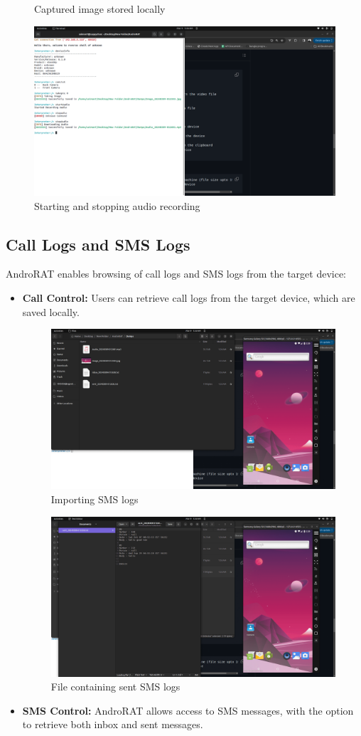 \documentclass[12pt]{article}
\begin{document}
\begin{itemize}
\begin{figure}[h!]
      \caption{Captured image stored locally}
    \end{figure}
    \begin{figure}[h!]
      \centering
      \includegraphics[width=0.6\linewidth]{audioStartStop.png}
      \caption{Starting and stopping audio recording}
    \end{figure}
\end{itemize}

\subsection{Call Logs and SMS Logs}
AndroRAT enables browsing of call logs and SMS logs from the target device:
\begin{itemize}
    \item \textbf{Call Control:} Users can retrieve call logs from the target device, which are saved locally.
    \begin{figure}[h!]
      \centering
      \includegraphics[width=0.6\linewidth]{importedSMS.png}
      \caption{Importing SMS logs}
    \end{figure}
    \begin{figure}[h!]
      \centering
      \includegraphics[width=0.6\linewidth]{fileofSentSMS.png}
      \caption{File containing sent SMS logs}
    \end{figure}
    \item \textbf{SMS Control:} AndroRAT allows access to SMS messages, with the option to retrieve both inbox and sent messages.
\end{itemize}
\end{document}

